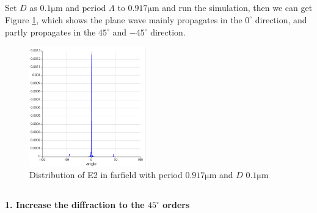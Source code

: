 \documentclass[fontsize=11pt]{scrartcl}
\begin{document}
\subsection{}
Set $D$ as $0.1\mathrm{\mu m}$ and period $\Lambda$ to $0.917\mathrm{\mu m}$ and 
run the simulation, then we can get Figure \ref{fig1.2}, 
which shows the plane wave mainly propagates in the $0^\circ$ direction, 
and partly propagates in the $45^\circ$ and $-45^\circ$ direction.
\begin{figure}[H]
    \centering
     \includegraphics[width=0.45\textwidth]{img/fig1.2.png}
     \caption{Distribution of E2 in farfield with 
     period $0.917\mathrm{\mu m}$ and $D$ $0.1\mathrm{\mu m}$}
     \label{fig1.2}
\end{figure}
\subsection{}
\textbf{1. Increase the diffraction to the $45^\circ$ orders}
\end{document}
